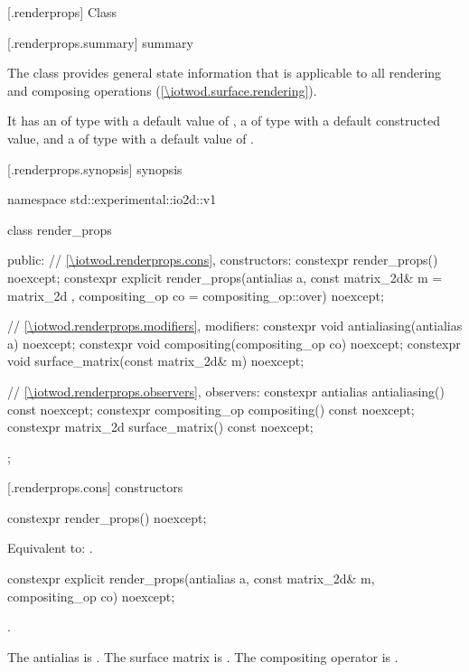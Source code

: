 
 [\iotwod.renderprops] {Class }

 [\iotwod.renderprops.summary] { summary}

\pnum
The  class provides general state information that is applicable to all rendering and composing operations (\ref{\iotwod.surface.rendering}).

\pnum
It has an  of type  with a default value of , a  of type  with a default constructed value, and a  of type  with a default value of .

 [\iotwod.renderprops.synopsis] { synopsis}

\begin{codeblock}
namespace std::experimental::io2d::v1 {
  class render_props {
  public:
    // \ref{\iotwod.renderprops.cons}, constructors:
    constexpr render_props() noexcept;
    constexpr explicit render_props(antialias a, const matrix_2d& m = 
      matrix_2d{ }, compositing_op co = compositing_op::over) noexcept;
    
    // \ref{\iotwod.renderprops.modifiers}, modifiers:
    constexpr void antialiasing(antialias a) noexcept;
    constexpr void compositing(compositing_op co) noexcept;
    constexpr void surface_matrix(const matrix_2d& m) noexcept;
    
    // \ref{\iotwod.renderprops.observers}, observers:
    constexpr antialias antialiasing() const noexcept;
    constexpr compositing_op compositing() const noexcept;
    constexpr matrix_2d surface_matrix() const noexcept;
  };
}
\end{codeblock}

 [\iotwod.renderprops.cons] { constructors}

\begin{itemdecl}
constexpr render_props() noexcept;
\end{itemdecl}
\begin{itemdescr}
\pnum
\effects
Equivalent to: .
\end{itemdescr}

%
\begin{itemdecl}
constexpr explicit render_props(antialias a, const matrix_2d& m,
  compositing_op co) noexcept;
\end{itemdecl}
\begin{itemdescr}
\pnum
\requires
{}.

\pnum
\effects
The antialias is . The surface matrix is . The compositing operator is .
\end{itemdescr}

